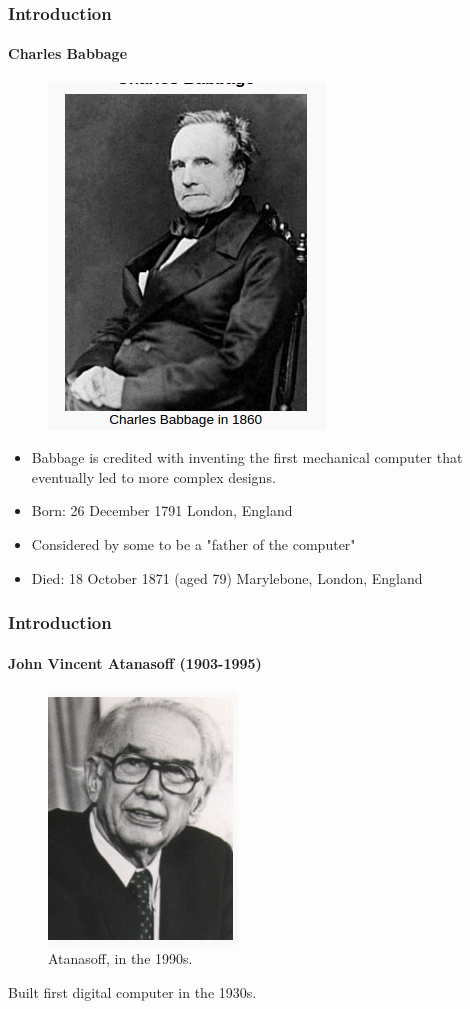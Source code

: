 \documentclass[hyperref={pdfpagelabels=true}]{beamer}
\begin{document}
\begin{frame}
\frametitle{Introduction}
\framesubtitle{Charles Babbage}
\begin{figure}[!tbp]
\centering
\includegraphics[scale = 0.35]{figs/Selection_006.png}
\end{figure}
\small{
\begin{itemize}
\item[\ding{45}]  Babbage is credited with inventing the first mechanical computer that eventually led to more complex designs.
\item Born: 26 December 1791 London, England   
\item Considered by some to be a "father of the computer"
\item Died: 18 October 1871 (aged 79) Marylebone, London, England
\end{itemize}}
\end{frame}

\begin{frame}
\frametitle{Introduction}
\framesubtitle{John Vincent Atanasoff (1903-1995)}
\begin{figure}[!tbp]
\centering
\includegraphics[scale = 0.5]{figs/Selection_01a2.png}
\caption[]{Atanasoff, in the 1990s.}
\end{figure}
Built first digital computer in the 1930s.
\end{frame}
\end{document}
